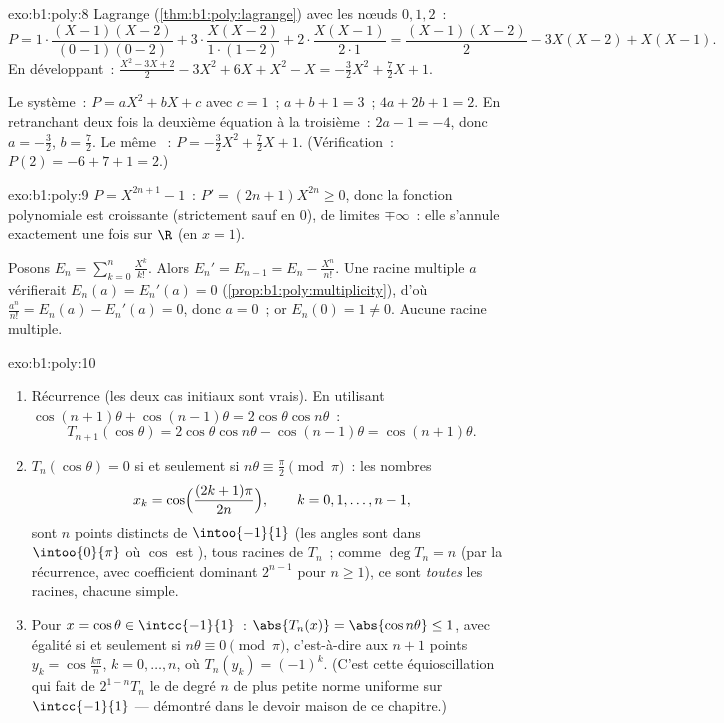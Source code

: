 \begin{solution}{exo:b1:poly:8}
Lagrange (\cref{thm:b1:poly:lagrange}) avec les nœuds $0, 1, 2$~:
\[
P = 1\cdot\frac{(X-1)(X-2)}{(0-1)(0-2)} + 3\cdot\frac{X(X-2)}{1\cdot(1-2)}
+ 2\cdot\frac{X(X-1)}{2\cdot 1}
= \frac{(X-1)(X-2)}{2} - 3X(X-2) + X(X-1).
\]
En développant~: $\frac{X^2 - 3X + 2}{2} - 3X^2 + 6X + X^2 - X =
-\frac{3}{2}X^2 + \frac{7}{2}X + 1$.

Le système~: $P = aX^2 + bX + c$ avec $c = 1$~; $a + b + 1 = 3$~; $4a +
2b + 1 = 2$. En retranchant deux fois la deuxième équation à la
troisième~: $2a - 1 = -4$, donc $a = -\frac32$, $b = \frac72$. Le même
~: $P = -\frac32 X^2 + \frac72 X + 1$. (Vérification~: $P(2) =
-6 + 7 + 1 = 2$.)
\end{solution}

\begin{solution}{exo:b1:poly:9}
$P = X^{2n+1} - 1$~: $P' = (2n+1)X^{2n} \geq 0$, donc la fonction
polynomiale est croissante (strictement sauf en $0$), de limites
$\mp\infty$~: elle s'annule exactement une fois sur $\R$ (en $x = 1$).

Posons $E_n = \sum_{k=0}^{n} \frac{X^k}{k!}$. Alors $E_n' = E_{n-1} =
E_n - \frac{X^n}{n!}$. Une racine multiple $a$ vérifierait $E_n(a) =
E_n'(a) = 0$ (\cref{prop:b1:poly:multiplicity}), d'où
$\frac{a^n}{n!} = E_n(a) - E_n'(a) = 0$, donc $a = 0$~; or $E_n(0) = 1
\neq 0$. Aucune racine multiple.
\end{solution}

\begin{solution}{exo:b1:poly:10}
\begin{enumerate}
  \item Récurrence (les deux cas initiaux sont vrais). En utilisant
        $\cos(n+1)\theta + \cos(n-1)\theta = 2\cos\theta\cos
        n\theta$~:
        \[
        T_{n+1}(\cos\theta) = 2\cos\theta \cos n\theta -
        \cos(n-1)\theta = \cos(n+1)\theta .
        \]
  \item $T_n(\cos\theta) = 0$ si et seulement si $n\theta \equiv
        \frac\pi2 \pmod \pi$~: les nombres
        \[
        x_k = \cos\Bigl(\frac{(2k+1)\pi}{2n}\Bigr),
        \qquad k = 0, 1, \dots, n-1,
        \]
        sont $n$ points distincts de $\intoo{-1}{1}$ (les angles sont
        dans $\intoo{0}{\pi}$ où $\cos$ est ), tous racines
        de $T_n$~; comme $\deg T_n = n$ (par la récurrence, avec
        coefficient dominant $2^{n-1}$ pour $n \geq 1$), ce sont
        \emph{toutes} les racines, chacune simple.
  \item Pour $x = \cos\theta \in \intcc{-1}{1}$~: $\abs{T_n(x)} =
        \abs{\cos n\theta} \leq 1$, avec égalité si et seulement si
        $n\theta \equiv 0 \pmod\pi$, c'est-à-dire aux $n+1$ points
        $y_k = \cos\frac{k\pi}{n}$, $k = 0, \dots, n$, où $T_n(y_k) =
        (-1)^k$. (C'est cette équioscillation qui fait de
        $2^{1-n}T_n$ le  de degré $n$ de plus petite
        norme uniforme sur $\intcc{-1}{1}$ --- démontré dans le
        devoir maison de ce chapitre.)
\end{enumerate}
\end{solution}


